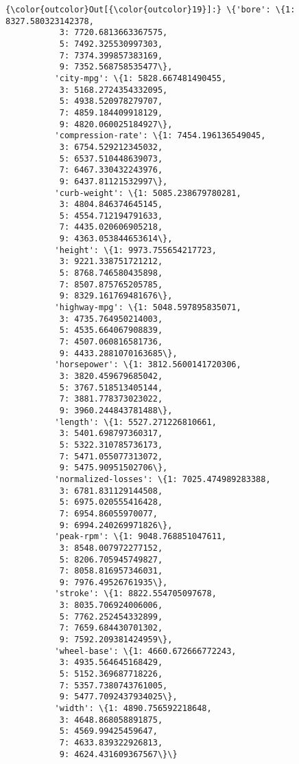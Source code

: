\documentclass[11pt]{article}
\begin{document}
\begin{Verbatim}[commandchars=\\\{\}]
{\color{outcolor}Out[{\color{outcolor}19}]:} \{'bore': \{1: 8327.580323142378,
           3: 7720.6813663367575,
           5: 7492.325530997303,
           7: 7374.399857383169,
           9: 7352.568758535477\},
          'city-mpg': \{1: 5828.667481490455,
           3: 5168.2724354332095,
           5: 4938.520978279707,
           7: 4859.184409918129,
           9: 4820.060025184927\},
          'compression-rate': \{1: 7454.196136549045,
           3: 6754.529212345032,
           5: 6537.510448639073,
           7: 6467.330432243976,
           9: 6437.81121532997\},
          'curb-weight': \{1: 5085.238679780281,
           3: 4804.846374645145,
           5: 4554.712194791633,
           7: 4435.020606905218,
           9: 4363.053844653614\},
          'height': \{1: 9973.755654217723,
           3: 9221.338751721212,
           5: 8768.746580435898,
           7: 8507.875765205785,
           9: 8329.161769481676\},
          'highway-mpg': \{1: 5048.597895835071,
           3: 4735.764950214003,
           5: 4535.664067908839,
           7: 4507.060816581736,
           9: 4433.2881070163685\},
          'horsepower': \{1: 3812.5600141720306,
           3: 3820.459679685042,
           5: 3767.518513405144,
           7: 3881.778373023022,
           9: 3960.244843781488\},
          'length': \{1: 5527.271226810661,
           3: 5401.698797360317,
           5: 5322.310785736173,
           7: 5471.055077313072,
           9: 5475.90951502706\},
          'normalized-losses': \{1: 7025.474989283388,
           3: 6781.831129144508,
           5: 6975.020555416428,
           7: 6954.86055970077,
           9: 6994.240269971826\},
          'peak-rpm': \{1: 9048.768851047611,
           3: 8548.007972277152,
           5: 8206.705945749827,
           7: 8058.816957346031,
           9: 7976.49526761935\},
          'stroke': \{1: 8822.554705097678,
           3: 8035.706924006006,
           5: 7762.252454332899,
           7: 7659.684430701302,
           9: 7592.209381424959\},
          'wheel-base': \{1: 4660.672666772243,
           3: 4935.564645168429,
           5: 5152.369687718226,
           7: 5357.7380743761005,
           9: 5477.7092437934025\},
          'width': \{1: 4890.756592218648,
           3: 4648.868058891875,
           5: 4569.99425459647,
           7: 4633.839322926813,
           9: 4624.431609367567\}\}
\end{Verbatim}
            
\end{document}
